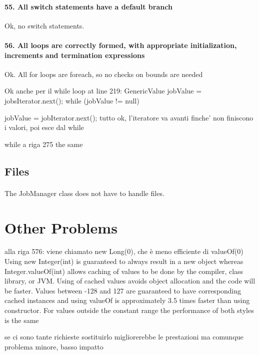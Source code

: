 \documentclass[english]{article}
\begin{document}
\paragraph{55. All switch statements have a default branch}
Ok, no switch statements.

\paragraph{56. All loops are correctly formed, with appropriate initialization, increments and termination expressions}
Ok.
All for loops are foreach, so no checks on bounds are needed

Ok anche per il while loop at line 219:
GenericValue jobValue = jobsIterator.next();
while (jobValue != null) {
jobValue = jobIterator.next();
tutto ok, l'iteratore va avanti finche' non finiscono i valori, poi esce dal while

while a riga 275 the same



\subsection{Files}
\paragraph{}
The JobManager class does not have to handle files.

\section{Other Problems} %
alla riga 576:
viene chiamato new Long(0), che è meno efficiente di valueOf(0)
Using new Integer(int) is guaranteed to always result in a new object whereas Integer.valueOf(int) allows caching of values to be done by the compiler, class library, or JVM. Using of cached values avoids object allocation and the code will be faster.
Values between -128 and 127 are guaranteed to have corresponding cached instances and using valueOf is approximately 3.5 times faster than using constructor. For values outside the constant range the performance of both styles is the same

se ci sono tante richieste sostituirlo migliorerebbe le prestazioni
ma comunque problema minore, basso impatto


}
\end{document}
